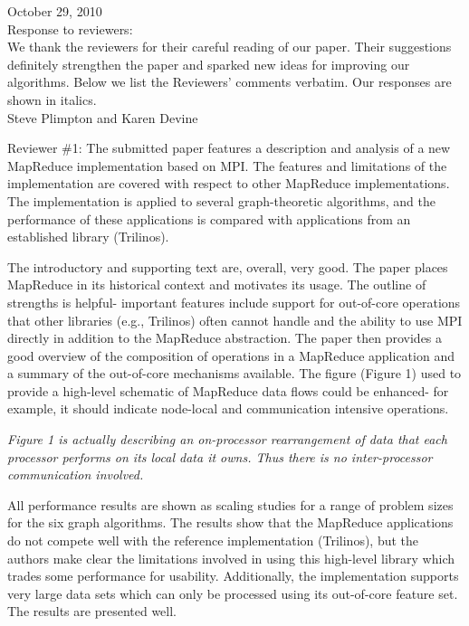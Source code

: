 \documentclass[11pt]{article}
\begin{document}
October 29, 2010\\

Response to reviewers:  \\

We thank the reviewers for their careful reading of our paper.  Their
suggestions definitely strengthen the paper and sparked new ideas for
improving our algorithms.  Below we list the Reviewers' comments
verbatim.  Our responses are shown in italics. \\

Steve Plimpton and Karen Devine

\vspace{0.5 in}

Reviewer \#1: The submitted paper features a description and analysis of a
new MapReduce implementation based on MPI.  The features and limitations
of the implementation are covered with respect to other MapReduce
implementations.  The implementation is applied to several
graph-theoretic algorithms, and the performance of these applications
is compared with applications from an established library (Trilinos).

The introductory and supporting text are, overall, very good.  The
paper places MapReduce in its historical context and motivates its
usage.  The outline of strengths is helpful- important features
include support for out-of-core operations that other libraries (e.g.,
Trilinos) often cannot handle and the ability to use MPI directly in
addition to the MapReduce abstraction.  The paper then provides a good
overview of the composition of operations in a MapReduce application
and a summary of the out-of-core mechanisms available.  The figure
(Figure 1) used to provide a high-level schematic of MapReduce data
flows could be enhanced- for example, it should indicate node-local
and communication intensive operations.

{\it Figure 1 is actually describing an on-processor rearrangement of
data that each processor performs on its local data it owns.  Thus
there is no inter-processor communication involved.}

All performance results are shown as scaling studies for a range of
problem sizes for the six graph algorithms.  The results show that the
MapReduce applications do not compete well with the reference
implementation (Trilinos), but the authors make clear the limitations
involved in using this high-level library which trades some
performance for usability.  Additionally, the implementation supports
very large data sets which can only be processed using its out-of-core
feature set.  The results are presented well.
\end{document}
